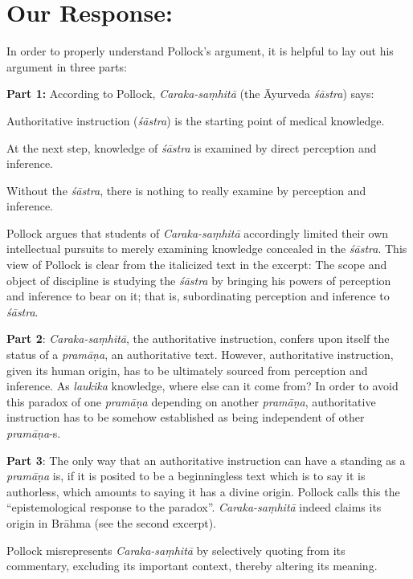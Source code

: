 \section*{Our Response:}

In order to properly understand Pollock's argument, it is helpful to lay out his argument in three parts:

{\bf Part 1:}
According to Pollock, {\sl Caraka-saṃhitā} (the Āyurveda {\sl śāstra}) says:
\begin{myquote}
Authoritative instruction ({\sl śāstra}) is the starting point of medical knowledge. 

At the next step, knowledge of {\sl śāstra} is examined by direct perception and inference.

Without the {\sl śāstra}, there is nothing to really examine by perception and inference.  
\end{myquote}

Pollock argues that students of {\sl Caraka-saṃhitā} accordingly limited their own intellectual pursuits to merely examining knowledge concealed in the {\sl śāstra}.  This view of Pollock is clear from the italicized text in the excerpt: The scope and object of discipline is studying the {\sl śāstra} by bringing his powers of perception and inference to bear on it; that is, subordinating perception and inference to {\sl śāstra}.

{\bf Part 2}: {\sl Caraka-saṃhitā}, the authoritative instruction, confers upon itself the status of a {\sl pramāṇa}, an authoritative text.  However, authoritative instruction, given its human  origin, has to be ultimately sourced from perception and inference.  As {\sl laukika} knowledge, where else can it come from? In order to avoid this paradox of one {\sl pramāṇa} depending on another {\sl pramāṇa}, authoritative instruction has to be somehow established as being independent of other {\sl pramāṇa}-s.

{\bf Part 3}: The only way that an authoritative instruction can have a standing as a {\sl pramāṇa} is, if it is posited to be a beginningless text which is to say it is authorless, which amounts to saying it has a divine origin.  Pollock calls this the ``epistemological response to the paradox''. {\sl Caraka-saṃhitā} indeed claims its origin in Brāhma (see the second excerpt).

Pollock misrepresents {{\sl Caraka-saṃhitā}\relax} by selectively quoting from its commentary, excluding its important context, thereby altering its meaning.

